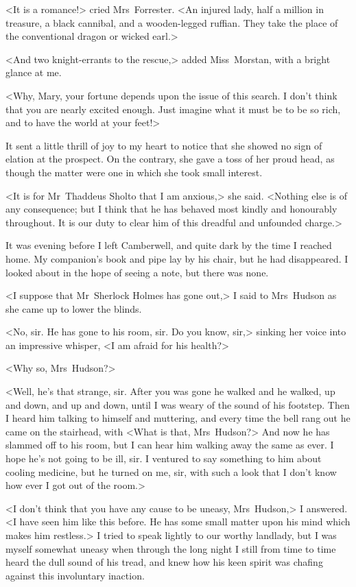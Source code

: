 <It is a romance!> cried Mrs~Forrester. <An injured lady, half a million in treasure, a black cannibal, and a wooden-legged ruffian. They take the place of the conventional dragon or wicked earl.>

<And two knight-errants to the rescue,> added Miss~Morstan, with a bright glance at me.

<Why, Mary, your fortune depends upon the issue of this search. I don't think that you are nearly excited enough. Just imagine what it must be to be so rich, and to have the world at your feet!>

It sent a little thrill of joy to my heart to notice that she showed no sign of elation at the prospect. On the contrary, she gave a toss of her proud head, as though the matter were one in which she took small interest.

<It is for Mr~Thaddeus Sholto that I am anxious,> she said. <Nothing else is of any consequence; but I think that he has behaved most kindly and honourably throughout. It is our duty to clear him of this dreadful and unfounded charge.>

It was evening before I left Camberwell, and quite dark by the time I reached home. My companion's book and pipe lay by his chair, but he had disappeared. I looked about in the hope of seeing a note, but there was none.

<I suppose that Mr~Sherlock Holmes has gone out,> I said to Mrs~Hudson as she came up to lower the blinds.

<No, sir. He has gone to his room, sir. Do you know, sir,> sinking her voice into an impressive whisper, <I am afraid for his health?>

<Why so, Mrs~Hudson?>

<Well, he's that strange, sir. After you was gone he walked and he walked, up and down, and up and down, until I was weary of the sound of his footstep. Then I heard him talking to himself and muttering, and every time the bell rang out he came on the stairhead, with <What is that, Mrs~Hudson?> And now he has slammed off to his room, but I can hear him walking away the same as ever. I hope he's not going to be ill, sir. I ventured to say something to him about cooling medicine, but he turned on me, sir, with such a look that I don't know how ever I got out of the room.>

<I don't think that you have any cause to be uneasy, Mrs~Hudson,> I answered. <I have seen him like this before. He has some small matter upon his mind which makes him restless.> I tried to speak lightly to our worthy landlady, but I was myself somewhat uneasy when through the long night I still from time to time heard the dull sound of his tread, and knew how his keen spirit was chafing against this involuntary inaction.

